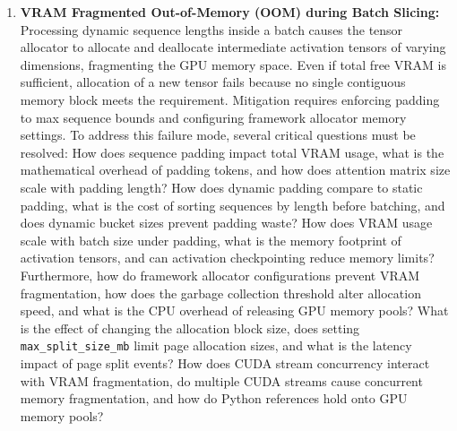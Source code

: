 \documentclass[11pt,a4paper]{article}
\theoremstyle{plain}
\theoremstyle{definition}
\theoremstyle{remark}
\begin{document}
\begin{enumerate}[label=\textbf{DF\arabic*.}]
    \item \textbf{VRAM Fragmented Out-of-Memory (OOM) during Batch Slicing:} 
    Processing dynamic sequence lengths inside a batch causes the tensor allocator to allocate and deallocate intermediate activation tensors of varying dimensions, fragmenting the GPU memory space. Even if total free VRAM is sufficient, allocation of a new tensor fails because no single contiguous memory block meets the requirement. 
    Mitigation requires enforcing padding to max sequence bounds and configuring framework allocator memory settings.
    To address this failure mode, several critical questions must be resolved: How does sequence padding impact total VRAM usage, what is the mathematical overhead of padding tokens, and how does attention matrix size scale with padding length? How does dynamic padding compare to static padding, what is the cost of sorting sequences by length before batching, and does dynamic bucket sizes prevent padding waste? How does VRAM usage scale with batch size under padding, what is the memory footprint of activation tensors, and can activation checkpointing reduce memory limits? Furthermore, how do framework allocator configurations prevent VRAM fragmentation, how does the garbage collection threshold alter allocation speed, and what is the CPU overhead of releasing GPU memory pools? What is the effect of changing the allocation block size, does setting \texttt{max\_split\_size\_mb} limit page allocation sizes, and what is the latency impact of page split events? How does CUDA stream concurrency interact with VRAM fragmentation, do multiple CUDA streams cause concurrent memory fragmentation, and how do Python references hold onto GPU memory pools?


\end{enumerate}
\end{document}
